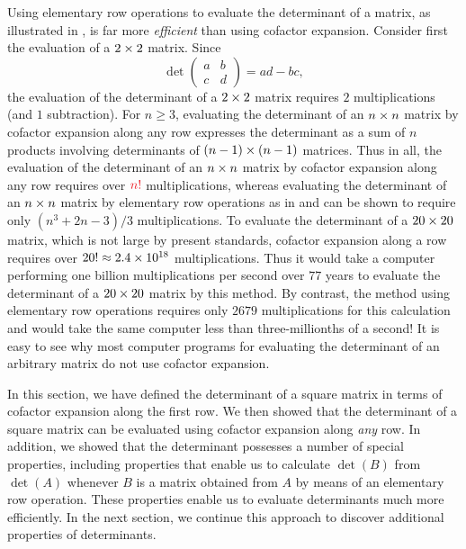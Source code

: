 Using elementary row operations to evaluate the determinant of a matrix, as illustrated in , is far more \emph{efficient} than using cofactor expansion.
Consider first the evaluation of a \(2 \times 2\) matrix.
Since
\[
    \det \begin{pmatrix} a & b \\ c & d \end{pmatrix} = ad - bc,
\]
the evaluation of the determinant of a \(2 \times 2\) matrix requires \(2\) multiplications (and \(1\) subtraction).
For \(n \ge 3\), evaluating the determinant of an \(n \times n\) matrix by cofactor expansion along any row expresses the determinant as a sum of \(n\) products involving determinants of \((n - 1) \times (n - 1)\) matrices.
Thus in all, the evaluation of the determinant of an \(n \times n\) matrix by cofactor expansion along any row requires over \(\RED{n!}\) multiplications,
whereas evaluating the determinant of an \(n \times n\) matrix by elementary row operations as in  and  can be shown to require only \((n^3 + 2n - 3) / 3\) multiplications.
To evaluate the determinant of a \(20 \times 20\) matrix, which is not large by present standards, cofactor expansion along a row requires over \(20! \approx 2.4 \times 10^{18}\) multiplications.
Thus it would take a computer performing one billion multiplications per second over \(77\) years to evaluate the determinant of a \(20 \times 20\) matrix by this method.
By contrast, the method using elementary row operations requires only \(2679\) multiplications for this calculation and would take the same computer less than three-millionths of a second!
It is easy to see why most computer programs for evaluating the determinant of an arbitrary matrix do not use cofactor expansion.

In this section, we have defined the determinant of a square matrix in terms of cofactor expansion along the first row.
We then showed that the determinant of a square matrix can be evaluated using cofactor expansion along \emph{any} row.
In addition, we showed that the determinant possesses a number of special properties, including properties that enable us to calculate \(\det(B)\) from \(\det(A)\) whenever \(B\) is a matrix obtained from \(A\) by means of an elementary row operation.
These properties enable us to evaluate determinants much more efficiently.
In the next section, we continue this approach to discover additional properties of determinants.

